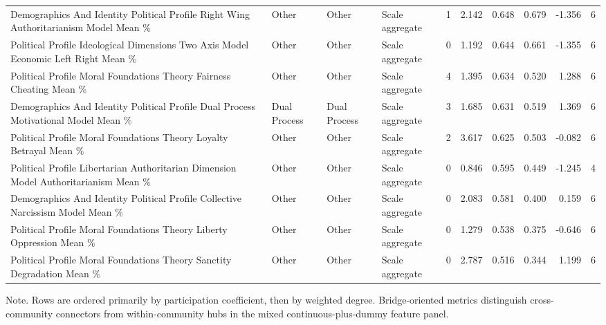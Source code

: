\begin{table}[htbp]
\begin{threeparttable}
\begin{adjustbox}{max width=\linewidth}
\begin{tabular}{llllrrrrrr}
Demographics And Identity Political Profile Right Wing Authoritarianism Model Mean \% & Other & Other & Scale aggregate & 1 & 2.142 & 0.648 & 0.679 & -1.356 & 6 \\
Political Profile Ideological Dimensions Two Axis Model Economic Left Right Mean \% & Other & Other & Scale aggregate & 0 & 1.192 & 0.644 & 0.661 & -1.355 & 6 \\
Political Profile Moral Foundations Theory Fairness Cheating Mean \% & Other & Other & Scale aggregate & 4 & 1.395 & 0.634 & 0.520 & 1.288 & 6 \\
Demographics And Identity Political Profile Dual Process Motivational Model Mean \% & Dual Process & Dual Process & Scale aggregate & 3 & 1.685 & 0.631 & 0.519 & 1.369 & 6 \\
Political Profile Moral Foundations Theory Loyalty Betrayal Mean \% & Other & Other & Scale aggregate & 2 & 3.617 & 0.625 & 0.503 & -0.082 & 6 \\
Political Profile Libertarian Authoritarian Dimension Model Authoritarianism Mean \% & Other & Other & Scale aggregate & 0 & 0.846 & 0.595 & 0.449 & -1.245 & 4 \\
Demographics And Identity Political Profile Collective Narcissism Model Mean \% & Other & Other & Scale aggregate & 0 & 2.083 & 0.581 & 0.400 & 0.159 & 6 \\
Political Profile Moral Foundations Theory Liberty Oppression Mean \% & Other & Other & Scale aggregate & 0 & 1.279 & 0.538 & 0.375 & -0.646 & 6 \\
Political Profile Moral Foundations Theory Sanctity Degradation Mean \% & Other & Other & Scale aggregate & 0 & 2.787 & 0.516 & 0.344 & 1.199 & 6 \\
\bottomrule
\end{tabular}
\end{adjustbox}
\begin{tablenotes}[flushleft]
\footnotesize
\item Note. Rows are ordered primarily by participation coefficient, then by weighted degree. Bridge-oriented metrics distinguish cross-community connectors from within-community hubs in the mixed continuous-plus-dummy feature panel.
\end{tablenotes}
\end{threeparttable}
\end{table}